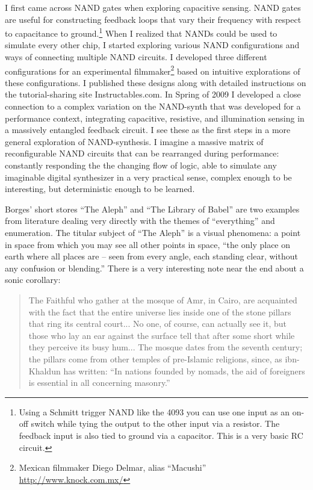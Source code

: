 \documentclass{thesis}
\begin{document}
	I first came across NAND gates when exploring capacitive sensing. NAND gates are useful for constructing feedback loops that vary their frequency with respect to capacitance to ground.\footnote{Using a Schmitt trigger NAND like the 4093 you can use one input as an on-off switch while tying the output to the other input via a resistor. The feedback input is also tied to ground via a capacitor. This is a very basic RC circuit.} When I realized that NANDs could be used to simulate every other chip, I started exploring various NAND configurations and ways of connecting multiple NAND circuits. I developed three different configurations for an experimental filmmaker\footnote{Mexican filmmaker Diego Delmar, alias ``Macushi'' \url{http://www.knock.com.mx/}} based on intuitive explorations of these configurations. I published these designs along with detailed instructions on the tutorial-sharing site Instructables.com. In Spring of 2009 I developed a close connection to a complex variation on the NAND-synth that was developed for a performance context, integrating capacitive, resistive, and illumination sensing in a massively entangled feedback circuit. I see these as the first steps in a more general exploration of NAND-synthesis. I imagine a massive matrix of reconfigurable NAND circuits that can be rearranged during performance: constantly responding the the changing flow of logic, able to simulate any imaginable digital synthesizer in a very practical sense, complex enough to be interesting, but deterministic enough to be learned.
	
	Borges' short stores ``The Aleph''\cite{borges_aleph_2004} and ``The Library of Babel''\cite{borges_library_2000} are two examples from literature dealing very directly with the themes of ``everything'' and enumeration. The titular subject of ``The Aleph'' is a visual phenomena: a point in space from which you may see all other points in space, ``the only place on earth where all places are -- seen from every angle, each standing clear, without any confusion or blending.'' There is a very interesting note near the end about a sonic corollary:
	
	\begin{quote}
	The Faithful who gather at the mosque of Amr, in Cairo, are acquainted with the fact that the entire universe lies inside one of the stone pillars that ring its central court... No one, of course, can actually see it, but those who lay an ear against the surface tell that after some short while they perceive its busy hum... The mosque dates from the seventh century; the pillars come from other temples of pre-Islamic religions, since, as ibn-Khaldun has written: ``In nations founded by nomads, the aid of foreigners is essential in all concerning masonry.''
	\end{quote}
	
\end{document}
